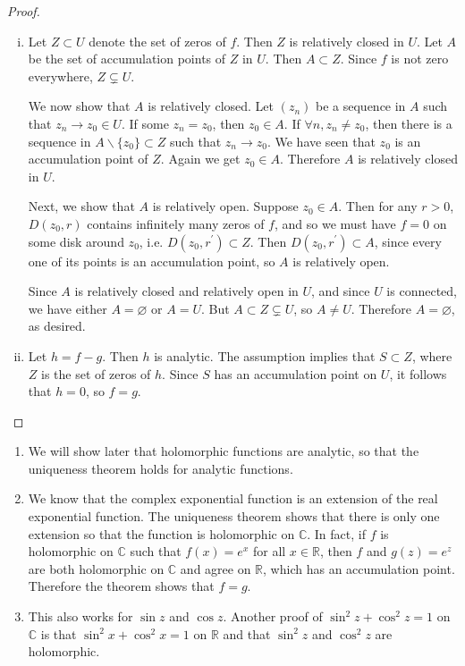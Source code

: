 \begin{proof}
  \begin{enumerate}[(i)]
    \item{
      Let $Z \subset U$ denote the set of zeros of $f$. Then $Z$ is
      relatively closed in $U$. Let $A$ be the set of
      accumulation points of $Z$ in $U$. Then $A \subset Z$.
      Since $f$ is not zero everywhere, $Z \subsetneq U$.

      We now show that $A$ is relatively closed.
      Let $(z_n)$ be a sequence in $A$ such that $z_n \to z_0 \in U$.
      If some $z_n = z_0$, then $z_0 \in A$. If
      $\forall n, z_n \neq z_0$, then there is a sequence in
      $A \backslash \{ z_0 \} \subset Z$ such that $z_n \to z_0$.
      We have seen that $z_0$ is an accumulation point of $Z$.
      Again we get $z_0 \in A$. Therefore $A$ is relatively closed in
      $U$.

      Next, we show that $A$ is relatively open. Suppose $z_0 \in A$. Then for any
      $r > 0$, $D(z_0, r)$ contains infinitely many zeros of $f$, and so
      we must have $f = 0$ on some disk around $z_0$, i.e.
      $D(z_0, r^\prime) \subset Z$. Then $D(z_0, r^\prime) \subset A$,
      since every one of its points is an accumulation point, so
      $A$ is relatively open.

      Since $A$ is relatively closed and relatively open in $U$, and since
      $U$ is connected, we have either $A = \varnothing$ or $A = U$. But
      $A \subset Z \subsetneq U$, so $A \neq U$. Therefore $A = \varnothing$,
      as desired.
    }
    \item{
      Let $h = f - g$. Then $h$ is analytic. The assumption implies that
      $S \subset Z$, where $Z$ is the set of zeros of $h$. Since $S$ has
      an accumulation point on $U$, it follows that $h = 0$, so $f = g$.
    }
  \end{enumerate}
\end{proof}

\begin{remark}
  \begin{enumerate}
    \item{
      We will show later that holomorphic functions are analytic,
      so that the uniqueness theorem holds for analytic functions.
    }
    \item{
      We know that the complex exponential function is an extension
      of the real exponential function. The uniqueness theorem shows
      that there is only one extension so that the function is
      holomorphic on $\mathbb{C}$. In fact, if $f$ is holomorphic on
      $\mathbb{C}$ such that $f(x) = e^x$ for all $x \in \mathbb{R}$,
      then $f$ and $g(z) = e^z$ are both holomorphic on $\mathbb{C}$
      and agree on $\mathbb{R}$, which has an accumulation point.
      Therefore the theorem shows that $f = g$.
    }
    \item{
      This also works for $\sin z$ and $\cos z$. Another proof of
      $\sin^2 z + \cos^2 z = 1$ on $\mathbb{C}$ is that
      $\sin^2 x + \cos^2 x = 1$ on $\mathbb{R}$ and that
      $\sin^2 z$ and $\cos^2 z$ are holomorphic.
    }
  \end{enumerate}
\end{remark}
